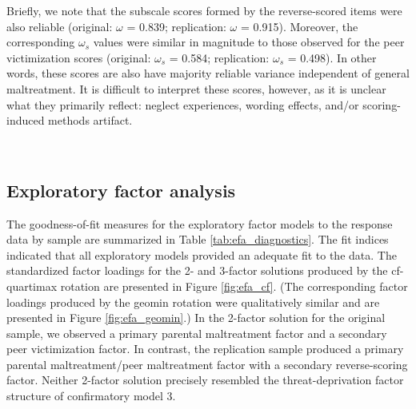 \documentclass[letterpaper,man,natbib,noextraspace,floatsintext,longtable]{apa6}
\begin{document}
Briefly, we note that the subscale scores formed by the reverse-scored items were also reliable (original: $\omega$ = 0.839; replication: $\omega$ = 0.915). Moreover, the corresponding $\omega_s$ values were similar in magnitude to those observed for the peer victimization scores (original: $\omega_s$ = 0.584; replication: $\omega_s$ = 0.498). In other words, these scores are also have majority reliable variance independent of general maltreatment. It is difficult to interpret these scores, however, as it is unclear what they primarily reflect: neglect experiences, wording effects, and/or scoring-induced methods artifact. 

{\begin{spacing}{0.2} \hfill \\ \end{spacing}} \subsection{Exploratory factor analysis}

The goodness-of-fit measures for the exploratory factor models to the response data by sample are summarized in Table \ref{tab:efa_diagnostics}. The fit indices indicated that all exploratory models provided an adequate fit to the data. The standardized factor loadings for the 2- and 3-factor solutions produced by the cf-quartimax rotation are presented in Figure \ref{fig:efa_cf}. (The corresponding factor loadings produced by the geomin rotation were qualitatively similar and are presented in Figure \ref{fig:efa_geomin}.) In the 2-factor solution for the original sample, we observed a primary parental maltreatment factor and a secondary peer victimization factor. In contrast, the replication sample produced a primary parental maltreatment/peer maltreatment factor with a secondary reverse-scoring factor. Neither 2-factor solution precisely resembled the threat-deprivation factor structure of confirmatory model 3.
\end{document}

